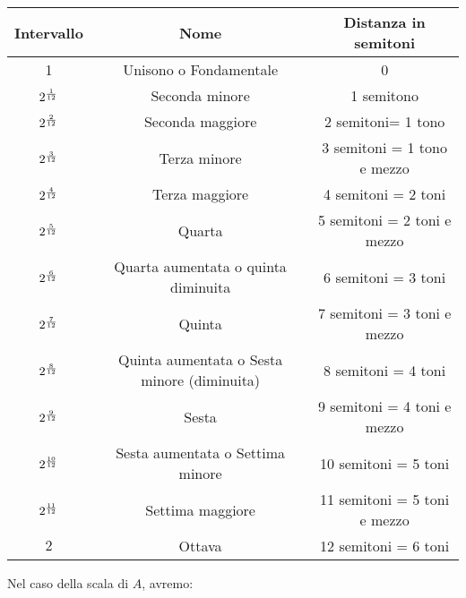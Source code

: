 \documentclass[12pt,a4paper]{report}
\theoremstyle{definition}
\theoremstyle{Theorem}
\theoremstyle{definition}
\theoremstyle{definition}
\theoremstyle{definition}
\begin{document}
	 \begin{center}
	 	\begin{tabular}{||c|c|c||} 
	 		\hline
	 		Intervallo & Nome & Distanza in semitoni\\ [0.5ex] 
	 		\hline\hline
	 		1 & Unisono o Fondamentale &0\\ 
	 		\hline
	 		$2^{1\over12}$ & Seconda minore& 1 semitono \\
	 		\hline
	 		$2^{2\over12}$ & Seconda maggiore& 2 semitoni= 1 tono\\
	 		\hline
	 		$2^{3\over12}$ & Terza minore&3 semitoni = 1 tono e mezzo\\
	 		\hline
	 		$2^{4\over12}$ & Terza maggiore & 4 semitoni = 2 toni \\ [1ex] 
	 		\hline
	 		$2^{5\over12}$ & Quarta & 5 semitoni = 2 toni e mezzo \\
	 		\hline
	 		$2^{6\over12}$ & Quarta aumentata o quinta diminuita &6 semitoni = 3 toni\\
	 		\hline
	 		$2^{7\over12}$ & Quinta&7 semitoni = 3 toni e mezzo\\
	 		\hline
	 		$2^{8\over12}$ & Quinta aumentata o Sesta minore (diminuita) & 8 semitoni = 4 toni \\ [1ex] 
	 		\hline
	 		$2^{9\over12}$ & Sesta & 9 semitoni = 4 toni e mezzo \\
	 		\hline
	 		$2^{10\over12}$ & Sesta aumentata o Settima minore & 10 semitoni = 5 toni\\
	 		\hline
	 		$2^{11\over12}$ & Settima maggiore &11 semitoni = 5 toni e mezzo\\
	 		\hline
	 		$2$ & Ottava &12 semitoni = 6 toni \\  
	 		\hline
	 	\end{tabular}
	 \end{center}
	  Nel caso della scala di $A$, avremo:
\end{document}
